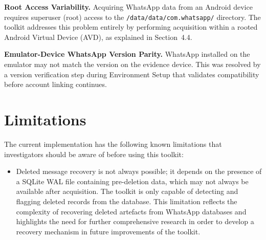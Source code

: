 \documentclass[12pt,a4paper]{report}
\begin{document}
\textbf{Root Access Variability.} Acquiring WhatsApp data from an Android device requires superuser (root) access to the \texttt{/data/data/com.whatsapp/} directory. The toolkit addresses this problem entirely by performing acquisition within a rooted Android Virtual Device (AVD), as explained in Section~4.4.

\textbf{Emulator-Device WhatsApp Version Parity.} WhatsApp installed on the emulator may not match the version on the evidence device. This was resolved by a version verification step during Environment Setup that validates compatibility before account linking continues.

\section{Limitations}

The current implementation has the following known limitations that investigators should be aware of before using this toolkit:

\begin{itemize}
    \item Deleted message recovery is not always possible; it depends on the presence of a SQLite WAL file containing pre-deletion data, which may not always be available after acquisition. The toolkit is only capable of detecting and flagging deleted records from the database. This limitation reflects the complexity of recovering deleted artefacts from WhatsApp databases and highlights the need for further comprehensive research in order to develop a recovery mechanism in future improvements of the toolkit.
\end{itemize}

\newpage


\end{document}

